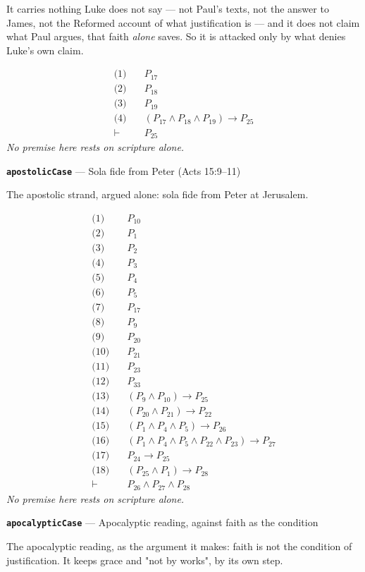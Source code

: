 \documentclass[11pt]{article}
\begin{document}
It carries nothing Luke does not say — not Paul's texts, not the answer to James, not the Reformed account of what justification is — and it does not claim what Paul argues, that faith \emph{alone} saves. So it is attacked only by what denies Luke's own claim.

\begin{align*}
  \text{(1)} \quad & P_{17} \\
  \text{(2)} \quad & P_{18} \\
  \text{(3)} \quad & P_{19} \\
  \text{(4)} \quad & (P_{17} \land P_{18} \land P_{19}) \rightarrow P_{25} \\
  \vdash \quad & P_{25}
\end{align*}
\emph{No premise here rests on scripture alone.}
\par\medskip\noindent\textbf{\texttt{apostolic\allowbreak{}Case}} --- Sola fide from Peter (Acts 15:9–11)\par\nobreak\noindent
The apostolic strand, argued alone: sola fide from Peter at Jerusalem.

\begin{align*}
  \text{(1)} \quad & P_{10} \\
  \text{(2)} \quad & P_{1} \\
  \text{(3)} \quad & P_{2} \\
  \text{(4)} \quad & P_{3} \\
  \text{(5)} \quad & P_{4} \\
  \text{(6)} \quad & P_{5} \\
  \text{(7)} \quad & P_{17} \\
  \text{(8)} \quad & P_{9} \\
  \text{(9)} \quad & P_{20} \\
  \text{(10)} \quad & P_{21} \\
  \text{(11)} \quad & P_{23} \\
  \text{(12)} \quad & P_{33} \\
  \text{(13)} \quad & (P_{9} \land P_{10}) \rightarrow P_{25} \\
  \text{(14)} \quad & (P_{20} \land P_{21}) \rightarrow P_{22} \\
  \text{(15)} \quad & (P_{1} \land P_{4} \land P_{5}) \rightarrow P_{26} \\
  \text{(16)} \quad & (P_{1} \land P_{4} \land P_{5} \land P_{22} \land P_{23}) \rightarrow P_{27} \\
  \text{(17)} \quad & P_{24} \rightarrow P_{25} \\
  \text{(18)} \quad & (P_{25} \land P_{1}) \rightarrow P_{28} \\
  \vdash \quad & P_{26} \land P_{27} \land P_{28}
\end{align*}
\emph{No premise here rests on scripture alone.}
\par\medskip\noindent\textbf{\texttt{apocalyptic\allowbreak{}Case}} --- Apocalyptic reading, against faith as the condition\par\nobreak\noindent
The apocalyptic reading, as the argument it makes: faith is not the condition of justification. It keeps grace and "not by works", by its own step.
\end{document}
